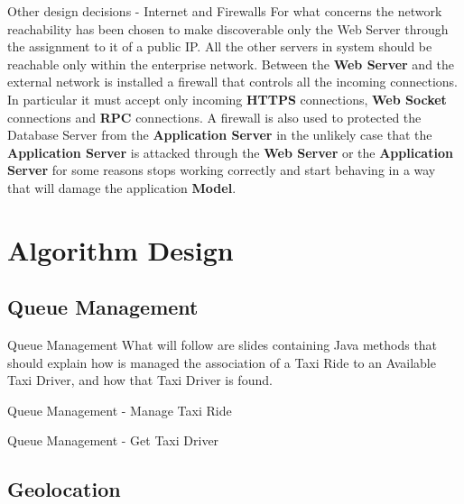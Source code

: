 \documentclass{../common/latex_classes/pdf_presentation}
\begin{document}
	
	\begin{frame}{Other design decisions - Internet and Firewalls}
		For what concerns the network reachability has been chosen to make discoverable only the Web Server through the assignment to it of a public IP.
		All the other servers in \myTaxiService{} system should be reachable only within the enterprise network.
		Between the \textbf{Web Server} and the external network is installed a firewall that controls all the incoming connections.
		In particular it must accept only incoming \textbf{HTTPS} connections, \textbf{Web Socket} connections and \textbf{RPC} connections.
		A firewall is also used to protected the Database Server from the \textbf{Application Server} in the unlikely case that the \textbf{Application Server} is attacked through the \textbf{Web Server} or the \textbf{Application Server} for some reasons stops working correctly and start behaving in a way that will damage the application \textbf{Model}.
	\end{frame}
	
	
	\section{Algorithm Design}

	\subsection{Queue Management}
	\configureJava{}
	\begin{frame}{Queue Management}
		What will follow are slides containing Java methods that should explain how is managed the association of a Taxi Ride to an Available Taxi Driver, and how that Taxi Driver is found.
	\end{frame}
	
	\begin{frame}{Queue Management - Manage Taxi Ride}
		
		
	\end{frame}
	
	\begin{frame}{Queue Management - Get Taxi Driver}
		
	\end{frame}
	
	\subsection{Geolocation}
	
\end{document}
